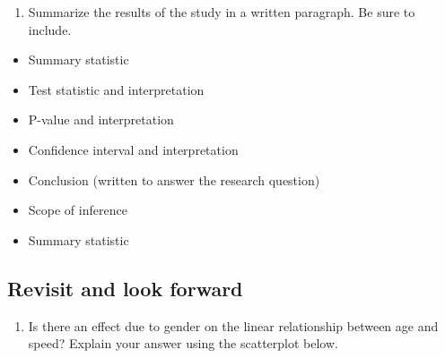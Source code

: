 \documentclass[
]{report}
\providecommand{\tightlist}{%
  \setlength{\itemsep}{0pt}\setlength{\parskip}{0pt}}
\begin{document}
\vspace{1in}

\begin{enumerate}
\def\labelenumi{\arabic{enumi}.}
\setcounter{enumi}{21}
\tightlist
\item
  Summarize the results of the study in a written paragraph. Be sure to include.
\end{enumerate}

\begin{itemize}
\item
  Summary statistic
\item
  Test statistic and interpretation
\item
  P-value and interpretation
\item
  Confidence interval and interpretation
\item
  Conclusion (written to answer the research question)
\item
  Scope of inference
\item
  Summary statistic
\end{itemize}

\vspace{2in}

\hypertarget{revisit-and-look-forward}{%
\subsection{Revisit and look forward}\label{revisit-and-look-forward}}

\begin{enumerate}
\def\labelenumi{\arabic{enumi}.}
\setcounter{enumi}{22}
\tightlist
\item
  Is there an effect due to gender on the linear relationship between age and speed? Explain your answer using the scatterplot below.
\end{enumerate}
\end{document}
